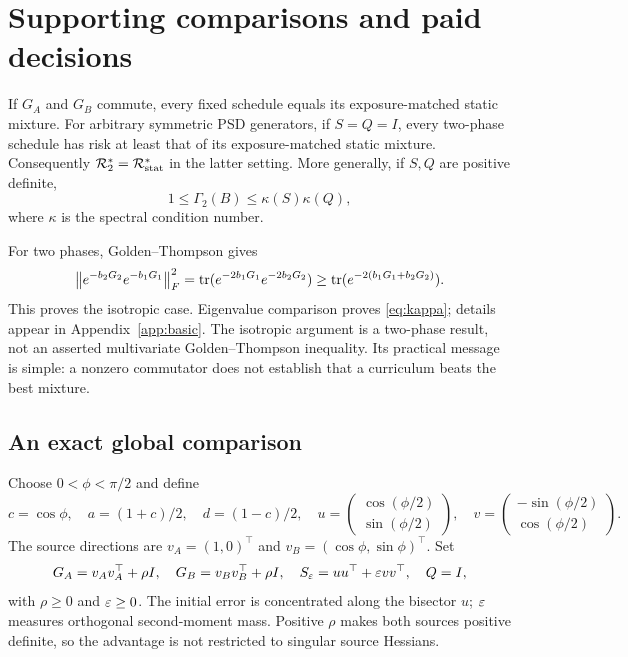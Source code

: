 \section{Supporting comparisons and paid decisions}
\begin{proposition}\label{prop:obstructions}
If $G_A$ and $G_B$ commute, every fixed schedule equals its exposure-matched static mixture. For arbitrary symmetric PSD generators, if $S=Q=I$, every two-phase schedule has risk at least that of its exposure-matched static mixture. Consequently $\mathcal R_{2}^*=\mathcal R_{\mathrm{stat}}^*$ in the latter setting. More generally, if $S,Q$ are positive definite,
\begin{equation}
 1\le\Gamma_2(B)\le\kappa(S)\kappa(Q),\label{eq:kappa}
\end{equation}
where $\kappa$ is the spectral condition number.
\end{proposition}
For two phases, Golden--Thompson gives
\begin{equation}
 \left\lVert e^{-b_2G_2}e^{-b_1G_1}\right\rVert_F^2
 =\operatorname{tr}(e^{-2b_1G_1}e^{-2b_2G_2})
 \ge\operatorname{tr}(e^{-2(b_1G_1+b_2G_2)}).
\end{equation}
This proves the isotropic case. Eigenvalue comparison proves \eqref{eq:kappa}; details appear in Appendix~\ref{app:basic}. The isotropic argument is a two-phase result, not an asserted multivariate Golden--Thompson inequality. Its practical message is simple: a nonzero commutator does not establish that a curriculum beats the best mixture.

\subsection{An exact global comparison}\label{sec:exact}
Choose $0<\phi<\pi/2$ and define
\begin{equation}
 c=\cos\phi,\quad a=(1+c)/2,\quad d=(1-c)/2,\quad
 u=\begin{pmatrix}\cos(\phi/2)\\\sin(\phi/2)\end{pmatrix},\quad
 v=\begin{pmatrix}-\sin(\phi/2)\\\cos(\phi/2)\end{pmatrix}.
\end{equation}
The source directions are $v_A=(1,0)^\top$ and $v_B=(\cos\phi,\sin\phi)^\top$. Set
\begin{equation}
 G_A=v_Av_A^\top+\rho I,\quad G_B=v_Bv_B^\top+\rho I,
 \quad S_\varepsilon=uu^\top+\varepsilon vv^\top,\quad Q=I,\label{eq:family}
\end{equation}
with $\rho\ge0$ and $\varepsilon\ge0$. The initial error is concentrated along the bisector $u$; $\varepsilon$ measures orthogonal second-moment mass. Positive $\rho$ makes both sources positive definite, so the advantage is not restricted to singular source Hessians.


